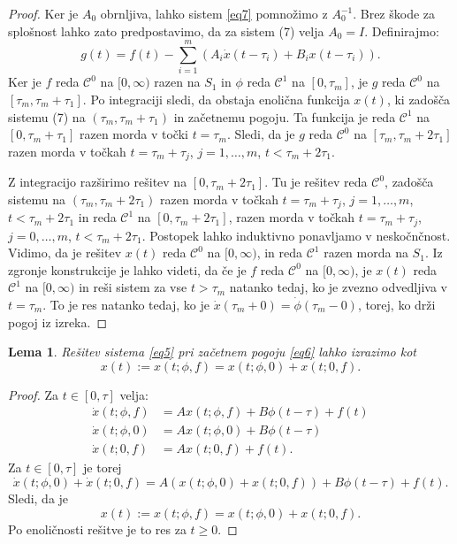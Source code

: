 \documentclass[12pt,a4paper]{amsart}
\theoremstyle{definition} %
\theoremstyle{plain} %
\newtheorem{lema}[definicija]{Lema}
\begin{document}
\begin{proof}
    Ker je $A_0$ obrnljiva, lahko sistem \eqref{eq7} pomnožimo z $A_0^{-1}$. Brez škode za splošnost lahko zato predpostavimo, da 
    za sistem (7) velja $A_0=I$. Definirajmo:
    \[g(t)=f(t)-\sum_{i=1}^{m}\left(A_i\dot{x}(t-\tau_i)+B_ix(t-\tau_i)\right).\]
    Ker je $f$ reda $\mathcal{C}^0$ na $[0,\infty)$ razen na $S_1$ in $\phi$ reda $\mathcal{C}^1$ na $[0,\tau_m]$, je
    $g$ reda $\mathcal{C}^0$ na $[\tau_m,\tau_m+\tau_1]$. Po integraciji sledi, da obstaja enolična funkcija $x(t)$, ki zadošča sistemu (7) na 
    $(\tau_m,\tau_m+\tau_1)$ in začetnemu pogoju. Ta funkcija je reda $\mathcal{C}^1$ na $[0,\tau_m+\tau_1]$ razen morda v 
    točki $t=\tau_m$. Sledi, da je 
    $g$ reda $\mathcal{C}^0$ na $[\tau_m,\tau_m+2\tau_1]$ razen morda v točkah $t=\tau_m+\tau_j$, $j=1,\dots,m$, $t<\tau_m+2\tau_1$.
    
    Z integracijo 
    razširimo rešitev na $[0,\tau_m+2\tau_1]$. 
    Tu je rešitev reda $\mathcal{C}^0$, zadošča sistemu na $(\tau_m,\tau_m+2\tau_1)$
    razen morda v točkah $t=\tau_m+\tau_j$, $j=1,\dots,m$, $t<\tau_m+2\tau_1$ in reda $\mathcal{C}^1$ na $[0,\tau_m+2\tau_1]$, razen 
    morda v točkah $t=\tau_m+\tau_j$, $j=0,\dots,m$, $t<\tau_m+2\tau_1$.
    Postopek lahko induktivno ponavljamo v neskočnčnost. Vidimo, da je
    rešitev $x(t)$ reda $\mathcal{C}^0$ na $[0,\infty)$, in reda $\mathcal{C}^1$ razen morda na $S_1$.
    Iz zgronje konstrukcije je lahko videti, da če je $f$ reda $\mathcal{C}^0$ na $[0,\infty)$, je $x(t)$
    reda $\mathcal{C}^1$ na $[0,\infty)$ in reši sistem za vse $t>\tau_m$ natanko tedaj, ko je zvezno odvedljiva v $t=\tau_m$.
    To je res natanko tedaj, ko je $\dot{x}(\tau_m+0)=\dot{\phi}(\tau_m-0)$, torej, ko drži pogoj iz izreka.
\end{proof}

\begin{lema}
    Rešitev sistema \eqref{eq5} pri začetnem pogoju \eqref{eq6} lahko izrazimo kot
    \[x(t):=x(t;\phi,f)=x(t;\phi,0)+x(t;0,f).\]
\end{lema}

\begin{proof}
    Za $t\in [0,\tau]$ velja:
    \begin{equation*}
        \begin{split}
            \dot{x}(t;\phi,f) &= Ax(t;\phi,f)+B\phi(t-\tau)+f(t) \\
            \dot{x}(t;\phi,0)  &= Ax(t;\phi,0)+B\phi(t-\tau)\\
            \dot{x}(t;0,f)  &= Ax(t;0,f)+f(t).
        \end{split}      
    \end{equation*}
Za $t\in[0,\tau]$ je torej
\[\dot{x}(t;\phi,0)+\dot{x}(t;0,f)=A\left(x(t;\phi,0)+x(t;0,f)\right)+B\phi(t-\tau)+f(t).\]
Sledi, da je
\[x(t):=x(t;\phi,f)=x(t;\phi,0)+x(t;0,f).\]
Po enoličnosti rešitve je to res za $t\geq0$.
\end{proof}
\end{document}
